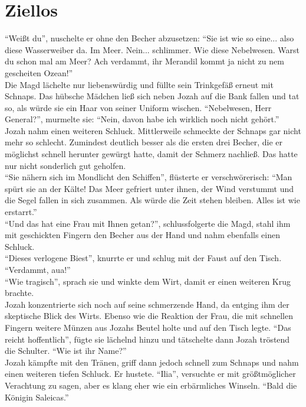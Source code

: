 \chapter{Ziellos}

``Weißt du'', nuschelte er ohne den Becher abzusetzen: ``Sie ist wie so eine... also diese 
Wasserweiber da. Im Meer. Nein... schlimmer. Wie diese Nebelwesen. Warst du schon mal am Meer? Ach 
verdammt, ihr Merandil kommt ja nicht zu nem gescheiten Ozean!''\\
Die Magd lächelte nur liebenswürdig und füllte sein Trinkgefäß erneut mit Schnaps. Das hübsche 
Mädchen ließ sich neben Jozah auf die Bank fallen und tat so, als würde sie ein Haar von seiner 
Uniform wischen. ``Nebelwesen, Herr General?'', murmelte sie: ``Nein, davon habe ich wirklich noch 
nicht gehört.''\\
Jozah nahm einen weiteren Schluck. Mittlerweile schmeckte der Schnaps gar nicht mehr so schlecht. 
Zumindest deutlich besser als die ersten drei Becher, die er möglichst schnell herunter gewürgt 
hatte, damit der Schmerz nachließ. Das hatte nur nicht sonderlich gut geholfen.\\
``Sie nähern sich im Mondlicht den Schiffen'', flüsterte er verschwörerisch: ``Man spürt sie an der 
Kälte! Das Meer gefriert unter ihnen, der Wind verstummt und die Segel fallen in sich zusammen. Als 
würde die Zeit stehen bleiben. Alles ist wie erstarrt.''\\
``Und das hat eine Frau mit Ihnen getan?'', schlussfolgerte die Magd, stahl ihm mit geschickten 
Fingern den Becher aus der Hand und nahm ebenfalls einen Schluck.\\
``Dieses verlogene Biest'', knurrte er und schlug mit der Faust auf den Tisch. ``Verdammt, aua!''\\
``Wie tragisch'', sprach sie und winkte dem Wirt, damit er einen weiteren Krug brachte.\\
Jozah konzentrierte sich noch auf seine schmerzende Hand, da entging ihm der skeptische Blick des 
Wirts. Ebenso wie die Reaktion der Frau, die mit schnellen Fingern weitere Münzen aus Jozahs Beutel 
holte und auf den Tisch legte. ``Das reicht hoffentlich'', fügte sie lächelnd hinzu und tätschelte 
dann Jozah tröstend die Schulter. ``Wie ist ihr Name?''\\
Jozah kämpfte mit den Tränen, griff dann jedoch schnell zum Schnaps und nahm einen weiteren tiefen 
Schluck. Er hustete. ``Ilia'', versuchte er mit größtmöglicher Verachtung zu sagen, aber es klang 
eher wie ein erbärmliches Winseln. ``Bald die Königin Saleicas.''\\
